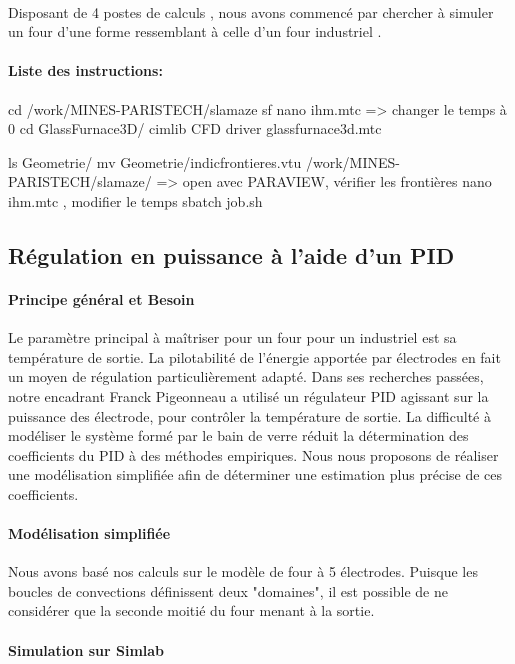 \documentclass[12pt, a4paper, french, BCOR = 0pt, DIV = 10]{scrartcl}
\begin{document}
	\paragraph{}
	 Disposant de 4 postes de calculs , nous avons commencé par chercher à simuler un four  d'une forme ressemblant à celle d'un four industriel .
	 
	 \paragraph{Liste des instructions:}
	 cd /work/MINES-PARISTECH/slamaze
	 sf
	 nano ihm.mtc => changer le temps à 0
	 cd GlassFurnace3D/
	 cimlib CFD driver glassfurnace3d.mtc
	 
	 ls Geometrie/
	 mv Geometrie/indicfrontieres.vtu /work/MINES-PARISTECH/slamaze/ => open avec PARAVIEW, vérifier les frontières
	 nano ihm.mtc , modifier le temps
	 sbatch job.sh

     \subsection{Régulation en puissance à l'aide d'un PID}
     \paragraph{Principe général et Besoin}
     Le paramètre principal à maîtriser pour un four pour un industriel est sa température de sortie. La pilotabilité de l'énergie apportée par électrodes en fait un moyen de régulation particulièrement adapté. Dans ses recherches passées, notre encadrant Franck Pigeonneau a utilisé un régulateur PID agissant sur la puissance des électrode, pour contrôler la température de sortie. La difficulté à modéliser le système formé par le bain de verre réduit la détermination des coefficients du PID à des méthodes empiriques. Nous nous proposons de réaliser une modélisation simplifiée afin de déterminer une estimation plus précise de ces coefficients.

     \paragraph{Modélisation simplifiée}
     Nous avons basé nos calculs sur le modèle de four à 5 électrodes. Puisque les boucles de convections définissent deux "domaines", il est possible de ne considérer que la seconde moitié du four menant à la sortie. 

     \paragraph{Simulation sur Simlab}
     
	
\end{document}
